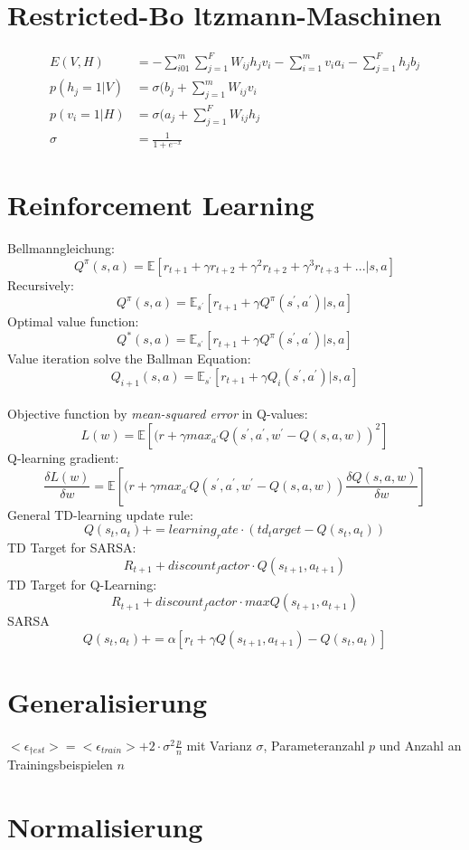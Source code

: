 \documentclass[paper=a4, fontsize=11pt]{scrartcl} %
\begin{document}
\section{Restricted-Bo	ltzmann-Maschinen}
\begin{align*}
E(V, H) &= - \sum_{i01}^m \sum_{j=1}^F W_{ij} h_j v_i - \sum_{i=1}^m v_i a_i - \sum_{j=1}^F h_j b_j \\
p(h_j = 1 | V) &= \sigma(b_j + \sum_{j=1}^m W_{ij}v_i \\
p(v_i = 1 | H) &= \sigma(a_j + \sum_{j=1}^F W_{ij}h_j \\
\sigma &= \frac{1}{1+e^{-x}}
\end{align*}

\section{Reinforcement Learning}
Bellmanngleichung:
\[
Q^{\pi}(s, a) = \mathbb{E}[r_{t + 1} + \gamma r_{t + 2} + \gamma^2 r_{t + 2} + \gamma^3 r_{t + 3} + ... | s, a]
\]
Recursively:
\[
Q^{\pi}(s, a) = \mathbb{E}_{s^{'}}[r_{t + 1} + \gamma Q^{\pi}(s^{'}, a^{'})| s, a]
\]
Optimal value function:
\[
Q^{*}(s, a) = \mathbb{E}_{s^{'}}[r_{t + 1} + \gamma Q^{\pi}(s^{'}, a^{'})| s, a]
\]
Value iteration solve the Ballman Equation:
\[
Q_{i + 1}(s, a) = \mathbb{E}_{s^{'}}[r_{t + 1} + \gamma Q_i(s^{'}, a^{'})| s, a]
\]
\\[1cm]
Objective function by \textit{mean-squared error} in Q-values:
\[
L(w) = \mathbb{E}[(r + \gamma max_{a^{'}}Q(s^{'}, a^{'}, w^{'} - Q(s, a, w))^2]
\]
Q-learning gradient:
\[
\frac{\delta L(w)}{\delta w} = \mathbb{E}[(r + \gamma max_{a^{'}}Q(s^{'}, a^{'}, w^{'} - Q(s, a, w)) \frac{\delta Q(s, a, w)}{\delta w}]
\]
General TD-learning update rule:
\[
Q(s_t, a_t) += learning_rate \cdot (td_target - Q(s_t, a_t))
\]
TD Target for SARSA:
\[
R_{t + 1} + discount_factor \cdot Q(s_{t + 1}, a_{t + 1})
\]
TD Target for Q-Learning:
\[
R_{t + 1} + discount_factor \cdot maxQ(s_{t + 1}, a_{t + 1})
\]
SARSA
\[
Q(s_t, a_t) += \alpha [r_t + \gamma Q(s_{t+1}, a_{t+1}) - Q(s_t, a_t)]
\]

\section{Generalisierung}

$<\epsilon_{†est}> = <\epsilon_{train}> + 2 \cdot \sigma^2 \frac{p}{n}$ mit Varianz $\sigma$, Parameteranzahl $p$ und Anzahl an Trainingsbeispielen $n$


\section{Normalisierung}
\end{document}
